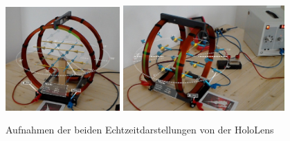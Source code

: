 \begin{figure}[h!]
	\centering
	\includegraphics[width=0.39\textwidth]{images/HL/fieldlines.jpg}
	\hspace{0.01\textwidth}
	\includegraphics[width=0.55\textwidth]{images/HL/Vektoren.jpg}
	\caption{Aufnahmen der beiden Echtzeitdarstellungen von der HoloLens }
	\label{img:hl_ss_intro}
\end{figure}


